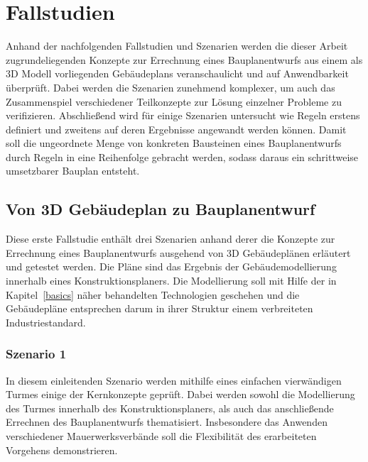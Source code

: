 \chapter{Fallstudien}\label{scenarios}
Anhand der nachfolgenden Fallstudien und Szenarien werden die dieser Arbeit zugrundeliegenden Konzepte zur Errechnung eines Bauplanentwurfs aus einem als 3D Modell vorliegenden Gebäudeplans veranschaulicht und auf Anwendbarkeit überprüft.
Dabei werden die Szenarien zunehmend komplexer, um auch das Zusammenspiel verschiedener Teilkonzepte zur Lösung einzelner Probleme zu verifizieren.
Abschließend wird für einige Szenarien untersucht wie Regeln erstens definiert und zweitens auf deren Ergebnisse angewandt werden können.
Damit soll die ungeordnete Menge von konkreten Bausteinen eines Bauplanentwurfs durch Regeln in eine Reihenfolge gebracht werden, sodass daraus ein schrittweise umsetzbarer Bauplan entsteht.

\section{Von 3D Gebäudeplan zu Bauplanentwurf}
Diese erste Fallstudie enthält drei Szenarien anhand derer die Konzepte zur Errechnung eines Bauplanentwurfs ausgehend von 3D Gebäudeplänen erläutert und getestet werden.
Die Pläne sind das Ergebnis der Gebäudemodellierung innerhalb eines Konstruktionsplaners.
Die Modellierung soll mit Hilfe der in Kapitel~\ref{basics} näher behandelten Technologien geschehen und die Gebäudepläne entsprechen darum in ihrer Struktur einem verbreiteten Industriestandard.

\subsection{Szenario 1}\label{scenarios:scenario1}
In diesem einleitenden Szenario werden mithilfe eines einfachen vierwändigen Turmes einige der Kernkonzepte geprüft.
Dabei werden sowohl die Modellierung des Turmes innerhalb des Konstruktionsplaners, als auch das anschließende Errechnen des Bauplanentwurfs thematisiert.
Insbesondere das Anwenden verschiedener Mauerwerksverbände soll die Flexibilität des erarbeiteten Vorgehens demonstrieren.
